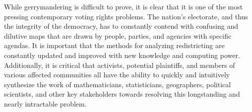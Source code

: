 While gerrymandering is difficult to prove, it is clear that it is one of the most pressing contemporary voting rights problems. The nation’s electorate, and thus the integrity of the democracy, has to constantly contend with confusing and dilutive maps that are drawn by people, parties, and agencies with specific agendas. It is important that the methods for analyzing redistricting are constantly updated and improved with new knowledge and computing power. Additionally, it is critical that activists, potential plaintiffs, and members of various affected communities all have the ability to quickly and intuitively synthesize the work of mathematicians, statisticians, geographers, political scientists, and other key stakeholders towards resolving this longstanding and nearly intractable problem.
